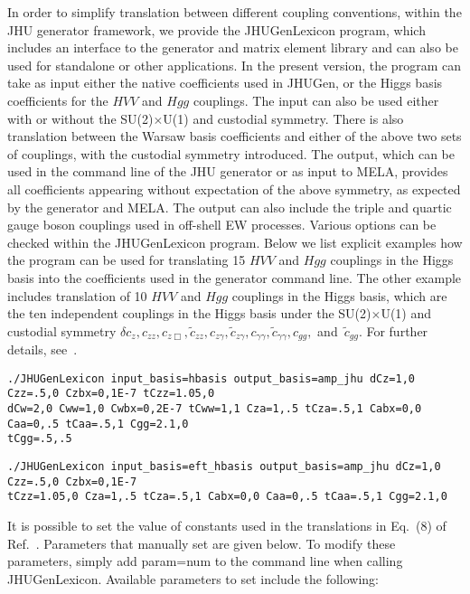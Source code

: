 \documentclass[aps,superscriptaddress,nofootinbib]{revtex4}
\begin{document}
In order to simplify translation between different coupling conventions, 
within the JHU generator framework, we provide the JHUGenLexicon program,
which includes an interface to the generator and matrix element library
and can also be used for standalone or other applications. 
In the present version, the program can take as input either the native coefficients used in JHUGen, 
or the Higgs basis coefficients for the $HVV$ and $Hgg$ couplings. 
The input can also be used either with or without the SU(2)$\times$U(1) and custodial symmetry.
There is also translation between the Warsaw basis coefficients and either of the above two sets of couplings,
with the custodial symmetry introduced. 
The output, which can be used in the command line of the JHU generator or as input to MELA, 
provides all coefficients appearing without expectation of the above symmetry, as expected by the
generator and MELA. The output can also include the triple and quartic gauge boson couplings
used in off-shell EW processes. 
Various options can be checked within the JHUGenLexicon program. Below we list explicit examples
how the program can be used for translating 15 $HVV$ and $Hgg$ couplings in the Higgs basis into the
coefficients used in the generator command line. The other example includes translation of 
10 $HVV$ and $Hgg$ couplings in the Higgs basis, which are the ten independent couplings in the Higgs basis 
under the SU(2)$\times$U(1) and custodial symmetry 
$\delta c_z, c_{zz}, c_{z \Box}, \tilde c_{zz}, c_{z \gamma}, \tilde c_{z \gamma}, c_{\gamma \gamma}, \tilde c_{\gamma \gamma}, c_{gg},$ and~$\tilde c_{gg}$.
For further details, see~\cite{Falkowski:2015wza}. 
\begin{verbatim}
./JHUGenLexicon input_basis=hbasis output_basis=amp_jhu dCz=1,0 Czz=.5,0 Czbx=0,1E-7 tCzz=1.05,0 
dCw=2,0 Cww=1,0 Cwbx=0,2E-7 tCww=1,1 Cza=1,.5 tCza=.5,1 Cabx=0,0 Caa=0,.5 tCaa=.5,1 Cgg=2.1,0
tCgg=.5,.5

\end{verbatim}
\begin{verbatim}
./JHUGenLexicon input_basis=eft_hbasis output_basis=amp_jhu dCz=1,0 Czz=.5,0 Czbx=0,1E-7 
tCzz=1.05,0 Cza=1,.5 tCza=.5,1 Cabx=0,0 Caa=0,.5 tCaa=.5,1 Cgg=2.1,0 
\end{verbatim}
It is possible to set the value of constants used in the translations in Eq.~(8) of Ref.~\cite{Gritsan:2020pib}. 
Parameters that manually set are given below. To modify these parameters, simply add param=num to the 
command line when calling JHUGenLexicon. Available parameters to set include the following:
\end{document}
